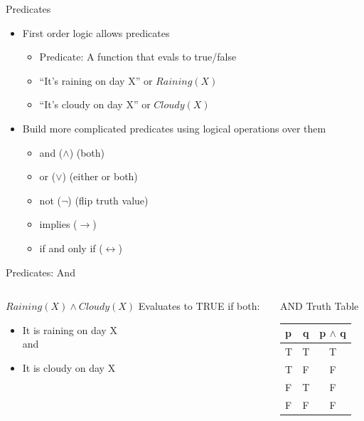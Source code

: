 \documentclass[aspectratio=169]{beamer}
\begin{document}
\begin{frame}{Predicates}

\begin{itemize}
\item First order logic allows predicates
	\begin{itemize}
	\item Predicate: A function that evals to true/false
	\item ``It's raining on day X'' or $Raining(X)$
	\item ``It's cloudy on day X'' or $Cloudy(X)$
	\end{itemize}
\item Build more complicated predicates using logical operations over them
	\begin{itemize}
	\item and ($\wedge$) (both)
	\item or ($\vee$)	(either or both)
	\item not ($\neg$)	(flip truth value)
	\item implies ($\rightarrow$)
	\item if and only if ($\leftrightarrow$)
	\end{itemize}
\end{itemize}
\end{frame}

\begin{frame}{Predicates: And}
\begin{columns}[t]
\begin{column}{0.6\textwidth}
$Raining(X) \wedge Cloudy(X)$
Evaluates to TRUE if both:
\begin{itemize}
\item It is raining on day X\\
and
\item It is cloudy on day X
\end{itemize}
\end{column}
\begin{column}{0.4\textwidth}
AND Truth Table\\
\begin{tabular}{|l|c||c| }  \hline
\textbf{p} & \textbf{q} & \textbf{p $\wedge$ q}\\ \hline
T & T & T\\ \hline
T & F & F\\ \hline
F & T & F\\ \hline
F & F & F\\ \hline
\end{tabular}
\end{column}
\end{columns}
\end{frame}
\end{document}
